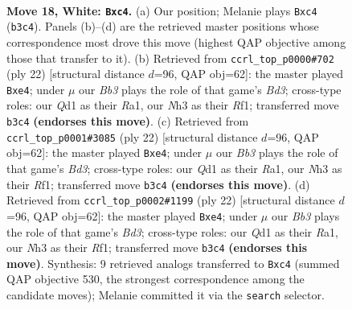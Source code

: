 \documentclass[11pt]{article}
\begin{document}
\clearpage

\begin{figure}[p]\centering
\begin{subfigure}{0.46\textwidth}\centering
\resizebox{\linewidth}{!}{%
\newchessgame
\chessboard[
  setfen={r2qk2r/ppp1b3/n4pp1/3p1b1p/P1nP4/1BN1R2N/RPP2PPP/2BQ2K1 w kq - 12 18},
  showmover=false,
  pgfstyle=straightmove, color=movearrow, markmove={b3-c4}
]}
\caption{}
\end{subfigure}\hfill
\begin{subfigure}{0.46\textwidth}\centering
\resizebox{\linewidth}{!}{%
\newchessgame
\chessboard[
  setfen={r1bqr1k1/pp1nbpp1/2p4p/3p4/3Pn2B/2NBPN2/PPQ2PPP/R4RK1 w - - 6 12},
  showmover=false,
  pgfstyle=straightmove, color=movearrow, markmove={d3-e4}
]}
\caption{}
\end{subfigure}
\\[4pt]
\begin{subfigure}{0.46\textwidth}\centering
\resizebox{\linewidth}{!}{%
\newchessgame
\chessboard[
  setfen={r1bqr1k1/pp1nbpp1/2p4p/3p4/3Pn2B/2NBPN2/PPQ2PPP/R4RK1 w - - 4 12},
  showmover=false,
  pgfstyle=straightmove, color=movearrow, markmove={d3-e4}
]}
\caption{}
\end{subfigure}\hfill
\begin{subfigure}{0.46\textwidth}\centering
\resizebox{\linewidth}{!}{%
\newchessgame
\chessboard[
  setfen={r1bqr1k1/pp1nbpp1/2p4p/3p4/3Pn2B/2NBPN2/PPQ2PPP/R4RK1 w - - 4 12},
  showmover=false,
  pgfstyle=straightmove, color=movearrow, markmove={d3-e4}
]}
\caption{}
\end{subfigure}
\caption{\textbf{Move 18, White: \texttt{Bxc4}.} (a) Our position; Melanie plays \texttt{Bxc4} (\texttt{b3c4}). Panels (b)--(d) are the retrieved master positions whose correspondence most drove this move (highest QAP objective among those that transfer to it). (b) Retrieved from \texttt{ccrl\_top\_p0000\#702} (ply 22) [structural distance $d$=96, QAP obj=62]: the master played \texttt{Bxe4}; under $\mu$ our \emph{Bb3} plays the role of that game's \emph{Bd3}; cross-type roles: our \emph{Q}d1 as their \emph{R}a1, our \emph{N}h3 as their \emph{R}f1; transferred move \texttt{b3c4} \textbf{(endorses this move)}. (c) Retrieved from \texttt{ccrl\_top\_p0001\#3085} (ply 22) [structural distance $d$=96, QAP obj=62]: the master played \texttt{Bxe4}; under $\mu$ our \emph{Bb3} plays the role of that game's \emph{Bd3}; cross-type roles: our \emph{Q}d1 as their \emph{R}a1, our \emph{N}h3 as their \emph{R}f1; transferred move \texttt{b3c4} \textbf{(endorses this move)}. (d) Retrieved from \texttt{ccrl\_top\_p0002\#1199} (ply 22) [structural distance $d$=96, QAP obj=62]: the master played \texttt{Bxe4}; under $\mu$ our \emph{Bb3} plays the role of that game's \emph{Bd3}; cross-type roles: our \emph{Q}d1 as their \emph{R}a1, our \emph{N}h3 as their \emph{R}f1; transferred move \texttt{b3c4} \textbf{(endorses this move)}. Synthesis: 9 retrieved analogs transferred to \texttt{Bxc4} (summed QAP objective 530, the strongest correspondence among the candidate moves); Melanie committed it via the \texttt{search} selector.}
\label{fig:thought-m34}
\end{figure}
\end{document}
